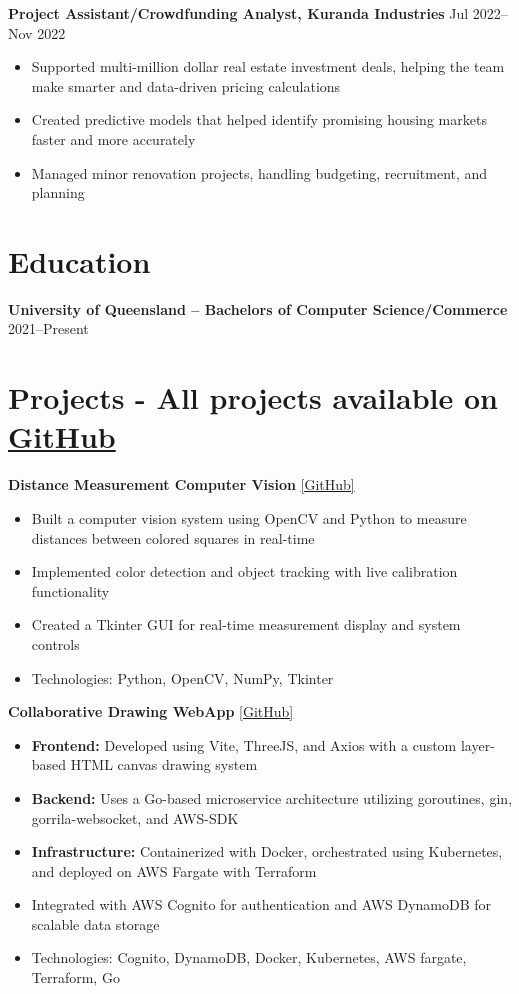 \documentclass[10pt,a4paper]{article}
\begin{document}
	\textbf{Project Assistant/Crowdfunding Analyst, Kuranda Industries} \hfill Jul 2022--Nov 2022 
	\begin{itemize}[label=\textbullet, itemsep=0.05cm]
		\item Supported multi-million dollar real estate investment deals, helping the team make smarter and data-driven pricing calculations 
		\item Created predictive models that helped identify promising housing markets faster and more accurately
		\item Managed minor renovation projects, handling budgeting, recruitment, and planning
	\end{itemize}
	
	\section{Education}
	\textbf{University of Queensland -- Bachelors of Computer Science/Commerce} \hfill 2021--Present \\	
	\section{Projects -  \textbf{All projects available on} \href{https://github.com/CameronBadman}{GitHub} }
	
	\textbf{Distance Measurement Computer Vision} \href{https://github.com/CameronBadman/computer-vision}{[GitHub]}
	\begin{itemize}[label=\textbullet, itemsep=0.05cm]
		\item Built a computer vision system using OpenCV and Python to measure distances between colored squares in real-time
		\item Implemented color detection and object tracking with live calibration functionality
		\item Created a Tkinter GUI for real-time measurement display and system controls
		\item Technologies: Python, OpenCV, NumPy, Tkinter
	\end{itemize}
	
	\textbf{Collaborative Drawing WebApp} \href{https://github.com/CameronBadman/Canvis-collab-webapp}{[GitHub]}
	\begin{itemize}[label=\textbullet, itemsep=0.05cm]
		\item \textbf{Frontend:} Developed using Vite, ThreeJS, and Axios with a custom layer-based HTML canvas drawing system
		\item \textbf{Backend:} Uses a Go-based microservice architecture utilizing goroutines, gin, gorrila-websocket, and AWS-SDK
		\item \textbf{Infrastructure:} Containerized with Docker, orchestrated using Kubernetes, and deployed on AWS Fargate with Terraform
		\item Integrated with AWS Cognito for authentication and AWS DynamoDB for scalable data storage
		\item Technologies: Cognito, DynamoDB, Docker, Kubernetes, AWS fargate, Terraform, Go
	\end{itemize}
	
\end{document}
